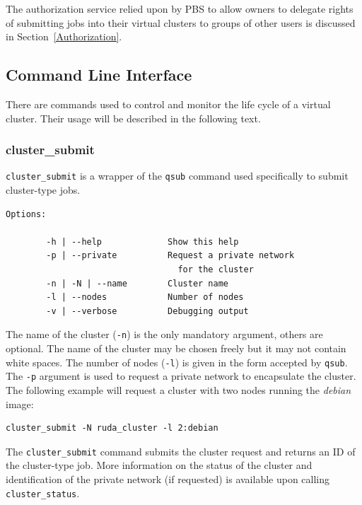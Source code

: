 \documentclass[a4paper]{article}
\newcommand{\TODO}[1]{
\begingroup{\noindent\textbf{TODO:\ #1}\par\medskip}\endgroup%
}
\begin{document}
The authorization service relied upon by PBS to allow owners to delegate
rights of submitting jobs into their virtual clusters to groups of other
users is discussed in Section~\ref{Authorization}. 


\subsection{Command Line Interface} 

There are commands used to control and monitor the life cycle of a virtual cluster. Their usage will be described in the following text.

\subsubsection{cluster\_submit}

\texttt{cluster\_submit} is a wrapper of the \texttt{qsub} command used specifically to submit cluster-type jobs.

\begin{verbatim}
Options:

        -h | --help             Show this help
        -p | --private          Request a private network
                                  for the cluster
        -n | -N | --name        Cluster name
        -l | --nodes            Number of nodes
        -v | --verbose          Debugging output
\end{verbatim}

The name of the cluster (\texttt{-n}) is the only mandatory argument,
others are optional. The name of the cluster may be chosen freely but it
may not contain white spaces. The number of nodes (\texttt{-l}) is given in
the form accepted by \texttt{qsub}. The \texttt{-p} argument is used to
request a private network to encapsulate the cluster. The following example will request a cluster with two nodes running the \emph{debian} image:

\begin{verbatim}
cluster_submit -N ruda_cluster -l 2:debian
\end{verbatim}

The \texttt{cluster\_submit} command submits the cluster request and returns an ID of the cluster-type job. More information on the status of the cluster and identification of the private network (if requested) is available upon calling \texttt{cluster\_status}.
\end{document}
